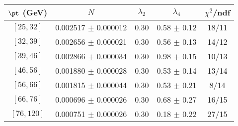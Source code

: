 \begin{tabular}{c||c|c|c|c}
$\pt$ (GeV) & $N$ & $\lambda_{2}$ & $\lambda_4$  & $\chi^2$/ndf  \\
\hline
$[25, 32]$ & 0.002517 $\pm$ 0.000012 & 0.30 & 0.58 $\pm$ 0.12 & 18/11\\
$[32, 39]$ & 0.002656 $\pm$ 0.000021 & 0.30 & 0.56 $\pm$ 0.13 & 14/12\\
$[39, 46]$ & 0.002866 $\pm$ 0.000034 & 0.30 & 0.98 $\pm$ 0.15 & 10/13\\
$[46, 56]$ & 0.001880 $\pm$ 0.000028 & 0.30 & 0.53 $\pm$ 0.14 & 13/14\\
$[56, 66]$ & 0.001815 $\pm$ 0.000044 & 0.30 & 0.53 $\pm$ 0.21 & 8/14\\
$[66, 76]$ & 0.000696 $\pm$ 0.000026 & 0.30 & 0.68 $\pm$ 0.27 & 16/15\\
$[76, 120]$ & 0.000751 $\pm$ 0.000026 & 0.30 & 0.18 $\pm$ 0.22 & 27/15\\
\end{tabular}
